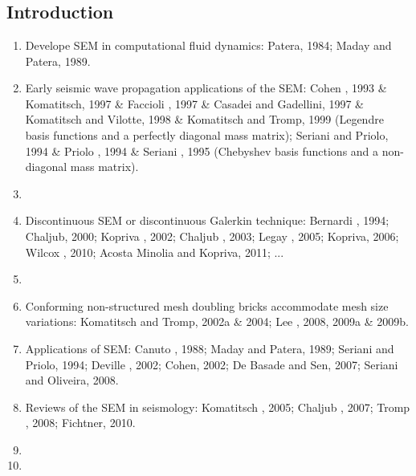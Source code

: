 \renewcommand{\pmk}{Peter\_2011\_GJI\_Adjoint on hexahedral meshes}
\renewcommand{\prf}{FWI/\pmk.pdf}
\renewcommand{\pti}{Forward and adjoint simulations of seismic wave propagation
on fully unstructured hexahedral meshes}
\renewcommand{\pay}{Daniel Peter, Dimitri Komatitsch, Yang Luo, \etal, 2011}
\renewcommand{\pjo}{Geophys. J. Int.}
\renewcommand{\pda}{2017/4/14 Fri.}

\section{\pinfo}
\subsection{Introduction}
\begin{enumerate}[\hspace{10mm}*]
  \item Develope SEM in computational fluid dynamics:
    Patera, 1984; Maday and Patera, 1989.
  \item Early seismic wave propagation applications of the SEM:
    Cohen \etal, 1993 \& Komatitsch, 1997 \& Faccioli \etal, 1997
    \& Casadei and Gadellini, 1997 \& Komatitsch and Vilotte, 1998
    \& Komatitsch and Tromp, 1999
    (Legendre basis functions and a perfectly diagonal mass matrix);
    Seriani and Priolo, 1994 \& Priolo \etal, 1994 \& Seriani \etal, 1995
    (Chebyshev basis functions and a non-diagonal mass matrix).
  \item \sline
  \item Discontinuous SEM or discontinuous Galerkin technique:
    Bernardi \etal, 1994; Chaljub, 2000; Kopriva \etal, 2002;
    Chaljub \etal, 2003; Legay \etal, 2005; Kopriva, 2006;
    Wilcox \etal, 2010; Acosta Minolia and Kopriva, 2011; ...
  \item \sline
  \item Conforming non-structured mesh doubling bricks accommodate
    mesh size variations: Komatitsch and Tromp, 2002a \& 2004;
    Lee \etal, 2008, 2009a \& 2009b.
  \item Applications of SEM: Canuto \etal, 1988; Maday and Patera, 1989;
    Seriani and Priolo, 1994; Deville \etal, 2002; Cohen, 2002;
    De Basade and Sen, 2007; Seriani and Oliveira, 2008.
  \item Reviews of the SEM in seismology: Komatitsch \etal, 2005;
    Chaljub \etal, 2007; Tromp \etal, 2008; Fichtner, 2010.
  \item \sline
  \item
\end{enumerate}

